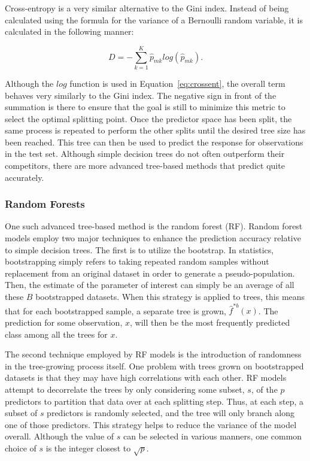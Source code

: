 \documentclass[12pt]{article}
\begin{document}
Cross-entropy is a very similar alternative to the Gini index.  Instead of being calculated 
using the formula for the variance of a Bernoulli random variable, it is calculated in the 
following manner:

\begin{equation}
  \label{eq:crossent}
   D = - \sum_{k = 1} ^ {K} \hat{p}_{mk} log (\hat{p}_{mk}).
\end{equation} 

Although the $log$ function is used in Equation~\eqref{eq:crossent}, the overall term behaves 
very similarly to the Gini index.  The negative sign in front of the summation is there to 
ensure that the goal is still to minimize this metric to select the optimal splitting point.  
Once the predictor space has been split, the same process is repeated to perform the other 
splits until the desired tree size has been reached.  This tree can then be used to predict 
the response for observations in the test set.  Although simple decision trees do not often 
outperform their competitors, there are more advanced tree-based methods that predict quite 
accurately.  

\subsubsection{Random Forests}
\label{sec:rf}

One such advanced tree-based method is the random forest (RF).  Random forest models employ 
two major techniques to enhance the prediction accuracy relative to simple decision trees.  
The first is to utilize the bootstrap.  In statistics, bootstrapping simply refers to taking 
repeated random samples without replacement from an original dataset in order to generate a 
pseudo-population.  Then, the estimate of the parameter of interest can simply be an average 
of all these $B$ bootstrapped datasets.  When this strategy is applied to trees, this means 
that for each bootstrapped sample, a separate tree is grown, 
$\hat{f} ^ {*b} (x)$.  The prediction for some observation, $x$, will then be the most 
frequently predicted class among all the trees for $x$.  

The second technique employed by RF models is the introduction of randomness in the 
tree-growing process itself.  One problem with trees grown on bootstrapped datasets is that 
they may have high correlations with each other.  RF models attempt to decorrelate the trees 
by only considering some subset, $s$, of the $p$ predictors to partition that data over at 
each splitting step.  Thus, at each step, a subset of $s$ predictors is randomly selected, 
and the tree will only branch along one of those predictors.  This strategy helps to reduce 
the variance of the model overall.  Although the value of $s$ can be selected in various 
manners, one common choice of $s$ is the integer closest to $\sqrt{p}$.
\end{document}
